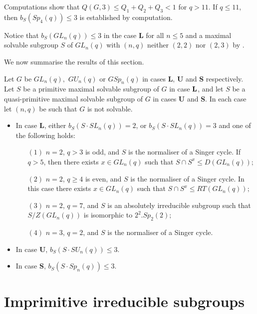 Computations show that $Q(G,3)\le Q_1+Q_2+Q_3 <1$ for $q>11.$ If $q \le 11$, then  $b_S(Sp_4(q)) \le 3$ is established by computation.

\medskip

\medskip

Notice that $b_S(GL_n(q))\le 3$ in the case {\bf L} for all $n \le 5$ and a maximal solvable subgroup $S$ of $GL_n(q)$ with $(n,q)$ neither $(2,2)$ nor $(2,3)$ by \cite[Table 2]{burness}.

\medskip

 We now summarise the results of this section.
\begin{Th}
\label{sec311lem}
Let ${G}$ be  $GL_n(q),$ $GU_n(q)$ or $GSp_n(q)$ in cases {\bf L}, {\bf U} and {\bf S} respectively. Let $S$ be a primitive maximal solvable subgroup of $G$ in case ${\bf L}$, and let $S$ be a quasi-primitive maximal solvable subgroup of $G$  in cases {\bf U} and {\bf S}. In each case let $(n,q)$ be such that $G$ is not solvable.
\begin{itemize}
\item In case {\bf L}, either $b_S(S \cdot SL_n(q))=2$, or $b_S(S \cdot SL_n(q))=3$ and one of the following holds:
\begin{enumerate}
\item[$(1)$] $n =2$,  $q>3$ is odd, and $S$ is the normaliser of a Singer cycle. If $q>5$, then there exists $x\in GL_n(q)$ such that  $S \cap S^x \le D(GL_n(q));$ 
\item[$(2)$] $n =2$,  $q\ge 4$ is even, and $S$ is the normaliser of a Singer cycle. In this case there exists $x\in GL_n(q)$ such that  $S \cap S^x \le RT(GL_n(q));$
\item[$(3)$] $n=2$, $q=7$, and $S$  is an absolutely irreducible subgroup such that $S/Z(GL_n(q))$ is isomorphic to $2^2.Sp_2(2);$
\item[$(4)$] $n=3$, $q=2$,  and $S$ is the normaliser of a Singer cycle. 
\end{enumerate}  
\item In case {\bf U}, $b_S(S \cdot SU_n(q))\le 3.$
\item In case  {\bf S}, $b_S(S \cdot Sp_n(q)) \le 3.$
\end{itemize}
\end{Th}


\section{Imprimitive irreducible subgroups}

